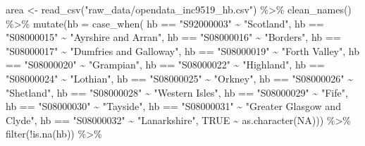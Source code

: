 \documentclass[
]{article}
\newenvironment{Shaded}{\begin{snugshade}}{\end{snugshade}}
\newcommand{\AttributeTok}[1]{\textcolor[rgb]{0.77,0.63,0.00}{#1}}
\newcommand{\ConstantTok}[1]{\textcolor[rgb]{0.00,0.00,0.00}{#1}}
\newcommand{\FunctionTok}[1]{\textcolor[rgb]{0.00,0.00,0.00}{#1}}
\newcommand{\NormalTok}[1]{#1}
\newcommand{\OtherTok}[1]{\textcolor[rgb]{0.56,0.35,0.01}{#1}}
\newcommand{\SpecialCharTok}[1]{\textcolor[rgb]{0.00,0.00,0.00}{#1}}
\newcommand{\StringTok}[1]{\textcolor[rgb]{0.31,0.60,0.02}{#1}}
\begin{document}
\begin{Shaded}
\begin{Highlighting}[]
\NormalTok{area }\OtherTok{\textless{}{-}} \FunctionTok{read\_csv}\NormalTok{(}\StringTok{"raw\_data/opendata\_inc9519\_hb.csv"}\NormalTok{) }\SpecialCharTok{\%\textgreater{}\%} 
  \FunctionTok{clean\_names}\NormalTok{() }\SpecialCharTok{\%\textgreater{}\%} 
  \FunctionTok{mutate}\NormalTok{(}\AttributeTok{hb =} \FunctionTok{case\_when}\NormalTok{(}
\NormalTok{    hb }\SpecialCharTok{==} \StringTok{"S92000003"} \SpecialCharTok{\textasciitilde{}} \StringTok{"Scotland"}\NormalTok{,}
\NormalTok{    hb }\SpecialCharTok{==} \StringTok{"S08000015"} \SpecialCharTok{\textasciitilde{}} \StringTok{"Ayrshire and Arran"}\NormalTok{,}
\NormalTok{    hb }\SpecialCharTok{==} \StringTok{"S08000016"} \SpecialCharTok{\textasciitilde{}} \StringTok{"Borders"}\NormalTok{,}
\NormalTok{    hb }\SpecialCharTok{==} \StringTok{"S08000017"} \SpecialCharTok{\textasciitilde{}} \StringTok{"Dumfries and Galloway"}\NormalTok{,}
\NormalTok{    hb }\SpecialCharTok{==} \StringTok{"S08000019"} \SpecialCharTok{\textasciitilde{}} \StringTok{"Forth Valley"}\NormalTok{,}
\NormalTok{    hb }\SpecialCharTok{==} \StringTok{"S08000020"} \SpecialCharTok{\textasciitilde{}} \StringTok{"Grampian"}\NormalTok{,}
\NormalTok{    hb }\SpecialCharTok{==} \StringTok{"S08000022"} \SpecialCharTok{\textasciitilde{}} \StringTok{"Highland"}\NormalTok{,}
\NormalTok{    hb }\SpecialCharTok{==} \StringTok{"S08000024"} \SpecialCharTok{\textasciitilde{}} \StringTok{"Lothian"}\NormalTok{,}
\NormalTok{    hb }\SpecialCharTok{==} \StringTok{"S08000025"} \SpecialCharTok{\textasciitilde{}} \StringTok{"Orkney"}\NormalTok{,}
\NormalTok{    hb }\SpecialCharTok{==} \StringTok{"S08000026"} \SpecialCharTok{\textasciitilde{}} \StringTok{"Shetland"}\NormalTok{,}
\NormalTok{    hb }\SpecialCharTok{==} \StringTok{"S08000028"} \SpecialCharTok{\textasciitilde{}} \StringTok{"Western Isles"}\NormalTok{,}
\NormalTok{    hb }\SpecialCharTok{==} \StringTok{"S08000029"} \SpecialCharTok{\textasciitilde{}} \StringTok{"Fife"}\NormalTok{,}
\NormalTok{    hb }\SpecialCharTok{==} \StringTok{"S08000030"} \SpecialCharTok{\textasciitilde{}} \StringTok{"Tayside"}\NormalTok{,}
\NormalTok{    hb }\SpecialCharTok{==} \StringTok{"S08000031"} \SpecialCharTok{\textasciitilde{}} \StringTok{"Greater Glasgow and Clyde"}\NormalTok{,}
\NormalTok{    hb }\SpecialCharTok{==} \StringTok{"S08000032"} \SpecialCharTok{\textasciitilde{}} \StringTok{"Lanarkshire"}\NormalTok{,}
    \ConstantTok{TRUE} \SpecialCharTok{\textasciitilde{}} \FunctionTok{as.character}\NormalTok{(}\ConstantTok{NA}\NormalTok{))) }\SpecialCharTok{\%\textgreater{}\%}
  \FunctionTok{filter}\NormalTok{(}\SpecialCharTok{!}\FunctionTok{is.na}\NormalTok{(hb)) }\SpecialCharTok{\%\textgreater{}\%} 

\end{Highlighting}
\end{Shaded}
\end{document}

